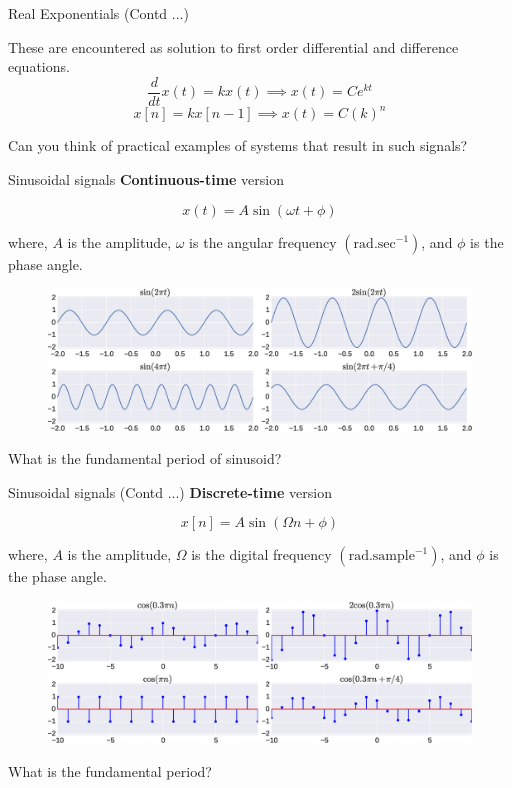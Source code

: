 \documentclass{beamer}
\begin{document}
\begin{frame}{Real Exponentials (Contd ...)}

These are encountered as solution to first order differential and difference equations.
\[ \frac{d}{dt}x(t) = kx(t) \implies x(t) = Ce^{kt} \]
\[ x[n] = kx[n-1] \implies x(t) = C(k)^n \]

Can you think of practical examples of systems that result in such signals?
\end{frame}

\begin{frame}{Sinusoidal signals}
\textbf{Continuous-time} version

\[ x(t) = A \sin \left(\omega t + \phi\right) \]

where, $A$ is the amplitude, $\omega$ is the angular frequency $\left(\mathrm{rad}.\mathrm{sec}^{-1}\right)$, and $\phi$ is the phase angle.

\begin{figure}
\includegraphics[width=\textwidth]{img/sinu.eps}
\end{figure}

What is the fundamental period of sinusoid?
\end{frame}

\begin{frame}{Sinusoidal signals (Contd ...)}
\textbf{Discrete-time} version

\[ x[n] = A \sin \left(\Omega n + \phi\right) \]

where, $A$ is the amplitude, $\Omega$ is the digital frequency $\left(\mathrm{rad}.\mathrm{sample}^{-1}\right)$, and $\phi$ is the phase angle.

\begin{figure}
\includegraphics[width=\textwidth]{img/disc_sinu.eps}
\end{figure}

What is the fundamental period?
\end{frame}
\end{document}

